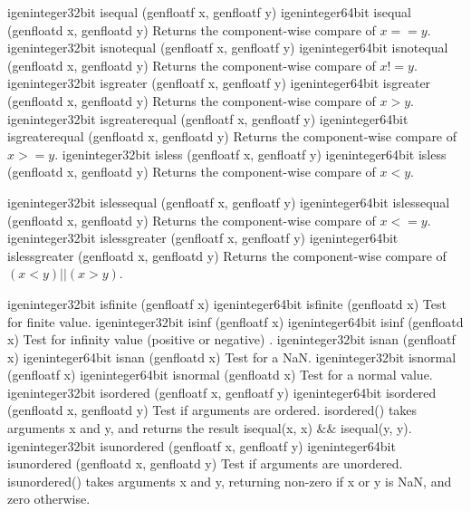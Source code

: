 

\addRowTwoSL
{igeninteger32bit isequal (genfloatf x, genfloatf y)}
{igeninteger64bit isequal (genfloatd x, genfloatd y)}
{
Returns the component-wise compare of $x == y$.
}
\addRowTwoSL
{igeninteger32bit isnotequal (genfloatf x, genfloatf y)}
{igeninteger64bit isnotequal (genfloatd x, genfloatd y)}
{
Returns the component-wise compare of $x != y$.
}
\addRowTwoSL
{igeninteger32bit isgreater (genfloatf x, genfloatf y)}
{igeninteger64bit isgreater (genfloatd x, genfloatd y)}
{
Returns the component-wise compare of $x > y$.
}
\addRowTwoSL
{igeninteger32bit isgreaterequal (genfloatf x, genfloatf y)}
{igeninteger64bit isgreaterequal (genfloatd x, genfloatd y)}
{
Returns the component-wise compare of $x >= y$.
}
\addRowTwoSL
{igeninteger32bit isless (genfloatf x, genfloatf y)}
{igeninteger64bit isless (genfloatd x, genfloatd y)}
{
Returns the component-wise compare of $x < y$.
}

\addRowTwoSL
{igeninteger32bit islessequal (genfloatf x, genfloatf y)}
{igeninteger64bit islessequal (genfloatd x, genfloatd y)}
{
Returns the component-wise compare of $x <= y$.
}
\addRowTwoSL
{igeninteger32bit islessgreater (genfloatf x, genfloatf y)}
{igeninteger64bit islessgreater (genfloatd x, genfloatd y)}
{
Returns the component-wise compare of
$(x < y) || (x > y) $.
}

\addRowTwoSL
{igeninteger32bit isfinite (genfloatf x)}
{igeninteger64bit isfinite (genfloatd x)}
{
Test for finite value.
}
\addRowTwoSL
{igeninteger32bit isinf (genfloatf x)}
{igeninteger64bit isinf (genfloatd x)}
{
Test for infinity value (positive or negative) .
}
\addRowTwoSL
{igeninteger32bit isnan (genfloatf x)}
{igeninteger64bit isnan (genfloatd x)}
{
Test for a NaN.
}
\addRowTwoSL
{igeninteger32bit isnormal (genfloatf x)}
{igeninteger64bit isnormal (genfloatd x)}
{
Test for a normal value.
}
\addRowTwoSL
{igeninteger32bit isordered (genfloatf x, genfloatf y)}
{igeninteger64bit isordered (genfloatd x, genfloatd y)}
{
Test if arguments are ordered. isordered() takes
arguments x and y, and returns the result
isequal(x, x) $\&\&$ isequal(y, y).
}
\addRowTwoSL
{igeninteger32bit isunordered (genfloatf x, genfloatf y)}
{igeninteger64bit isunordered (genfloatd x, genfloatd y)}
{
Test if arguments are unordered. isunordered()
takes arguments x and y, returning non-zero if x or
y is NaN, and zero otherwise.
}

